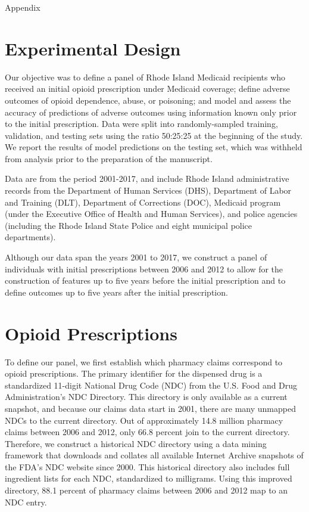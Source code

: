 \documentclass[11pt, letter]{article}
\begin{document}
\begin{center}
\huge Appendix
\end{center}

\section{Experimental Design}

Our objective was to define a panel of Rhode Island Medicaid recipients who received an initial opioid prescription under Medicaid coverage; define adverse outcomes of opioid dependence, abuse, or poisoning; and model and assess the accuracy of predictions of adverse outcomes using information known only prior to the initial prescription. Data were split into randomly-sampled training, validation, and testing sets using the ratio 50:25:25 at the beginning of the study. We report the results of model predictions on the testing set, which was withheld from analysis prior to the preparation of the manuscript.

Data are from the period 2001-2017, and include Rhode Island administrative records from the Department of Human Services (DHS), Department of Labor and Training (DLT), Department of Corrections (DOC), Medicaid program (under the Executive Office of Health and Human Services), and police agencies (including the Rhode Island State Police and eight municipal police departments).

Although our data span the years 2001 to 2017, we construct a panel of individuals with initial prescriptions between 2006 and 2012 to allow for the construction of features up to five years before the initial prescription and to define outcomes up to five years after the initial prescription.

\section{Opioid Prescriptions}

To define our panel, we first establish which pharmacy claims correspond to opioid prescriptions. The primary identifier for the dispensed drug is a standardized 11-digit National Drug Code (NDC) from the U.S. Food and Drug Administration's NDC Directory. This directory is only available as a current snapshot, and because our claims data start in 2001, there are many unmapped NDCs to the current directory. Out of approximately 14.8 million pharmacy claims between 2006 and 2012, only 66.8 percent join to the current directory. Therefore, we construct a historical NDC directory using a data mining framework that downloads and collates all available Internet Archive snapshots of the FDA's NDC website since 2000. This historical directory also includes full ingredient lists for each NDC, standardized to milligrams. Using this improved directory, 88.1 percent of pharmacy claims between 2006 and 2012 map to an NDC entry. 
\end{document}
